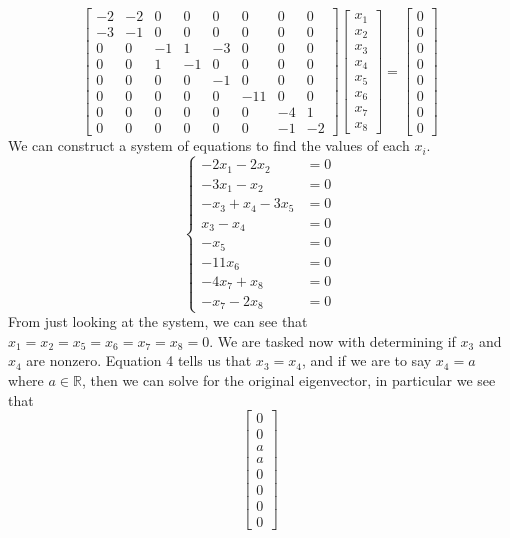 \documentclass{report}
\begin{document}
\begin{itemize}
$$\begin{bmatrix}
-2&-2&0&0&0&0&0&0\\
-3&-1&0&0&0&0&0&0\\
0&0&-1&1&-3&0&0&0\\
0&0&1&-1&0&0&0&0\\
0&0&0&0&-1&0&0&0\\
0&0&0&0&0&-11&0&0\\
0&0&0&0&0&0&-4&1\\
0&0&0&0&0&0&-1&-2
\end{bmatrix}
\begin{bmatrix}
x_1 \\ x_2 \\ x_3 \\ x_4 \\ x_5 \\ x_6 \\ x_7 \\ x_8
\end{bmatrix} = \begin{bmatrix}
0 \\ 0 \\ 0 \\ 0 \\ 0 \\ 0 \\ 0 \\ 0
\end{bmatrix}
$$
We can construct a system of equations to find the values of each $x_i$.
$$
\left\{
\begin{aligned}
-2x_1 - 2x_2 & = 0 \\
-3x_1 - x_2 & = 0 \\
-x_3+x_4-3x_5 & = 0 \\
x_3 - x_4 & = 0 \\
-x_5 & = 0 \\
-11x_6 & = 0 \\
-4x_7 + x_8 & = 0 \\
-x_7 - 2x_8 & = 0
\end{aligned}
\right.
$$
From just looking at the system,  we can see that $x_1 = x_2 = x_ 5 = x_6 = x_7 = x_8 = 0$.  We are tasked now with determining if $x_3$ and $x_4$ are nonzero.  Equation 4 tells us that $x_3 = x_4$,  and if we are to say $x_4 = a$ where $a\in\mathbb{R}$,  then we can solve for the original eigenvector,  in particular we see that
$$
\begin{bmatrix}
0 \\ 0 \\ a \\ a \\ 0 \\ 0 \\ 0 \\ 0

\end{bmatrix}$$
\end{itemize}
\end{document}
